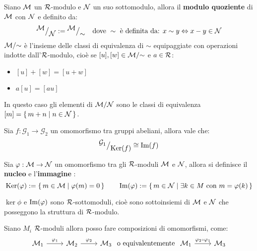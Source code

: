 \begin{definition}
  Siano $ \mathcal{M} $ un $ \mathcal{R} $-modulo e $ \mathcal{N} $ un suo sottomodulo, allora il \textbf{modulo
    quoziente}  di $ \mathcal{M} $ con $ \mathcal{N} $ e definito da:
  \[
    {^{\textstyle \mathcal{M}}\big/_{\textstyle \mathcal{N}}} := {^{\textstyle \mathcal{M}}\big/_{\textstyle \sim}} \quad \text{dove } \sim \text{ è definita da: } x \sim y \Leftrightarrow x - y \in \mathcal{N}
  \]
  $ {\mathcal{M}} \slash {\sim} $ è l'insieme delle classi di equivalenza di $ \sim $ equipaggiate
  con operazioni indotte dall'$ \mathcal{R} $-modulo, cioè se $ [u], [w] \in {\mathcal{M}} \slash {\sim} $ e $ a \in \mathcal{R} $:
  \begin{itemize}
  \item $ [u] + [w] = [u + w] $
  \item $ a [u] = [au] $
  \end{itemize}
  In questo caso gli elementi di $ {\mathcal{M}} \slash {\mathcal{N}} $ sono le classi di equivalenza
  $ [m] = \set{ m + n | n \in \mathcal{N}} $.
\end{definition}

\begin{theorem}
  Sia $ f: \mathcal{G}_1 \to \mathcal{G}_2 $ un omomorfismo tra gruppi abeliani, allora vale che:
  \[
    {^{\textstyle \mathcal{G}_1}\big/_{\textstyle \mathrm{Ker}( f)}} \cong \mathrm{Im}( f )
  \]
\end{theorem}


\begin{definition}
  Sia $ \varphi: \mathcal{M} \to \mathcal{N} $ un omomorfismo tra gli $ \mathcal{R} $-moduli $ \mathcal{M} $ e $ \mathcal{N} $,
  allora si definisce il \textbf{nucleo}  e l'\textbf{immagine} :
  \[
    \mathrm{Ker}( \varphi) := \set{ m \in \mathcal{M}| \varphi(m) = 0}  \qquad  \mathrm{Im}( \varphi ) := \set{ m \in \mathcal{N}| \exists k \in M \text{ con } m = \varphi(k)}
  \]
\end{definition}

\begin{osservation}
  $ \ker{\phi} $ e $ \mathrm{Im}( \varphi ) $ sono $ \mathcal{R} $-sottomoduli, cioè sono sottoinsiemi di $ \mathcal{M} $ e $ \mathcal{N} $
  che posseggono la struttura di $ \mathcal{R} $-modulo.
\end{osservation}
Siano $ M_i $ $ \mathcal{R} $-moduli allora posso fare composizioni di omomorfismi, come:
\[
  \begin{tikzcd}
    \M_1 \rar{\phi_1} & \M_2 \rar{\phi_2} & \M_3
  \end{tikzcd}
  \text{ o equivalentemente }
  \begin{tikzcd}
    \M_1 \rar{\phi_2 \circ \phi_1} & \M_3
  \end{tikzcd}
\]

